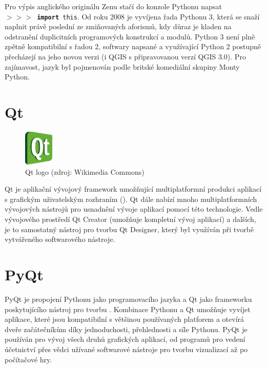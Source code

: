 Pro výpis anglického originálu Zenu stačí do konzole Pythonu napsat \\ \texttt{$>>>$~\textbf{import}~this}. Od roku 2008 je vyvíjena řada Pythonu 3, která se snaží naplnit právě poslední ze zmiňovaných aforismů, kdy důraz je kladen na odstranění duplicitních programových konstrukcí a modulů. Python 3 není plně zpětně kompatibilní s řadou 2, softwary napsané a využívající Python 2 postupně přecházejí na jeho novou verzi (i QGIS s připravovanou verzí QGIS 3.0). Pro zajímavost, jazyk byl pojmenován podle britské komediální skupiny Monty Python. \cite{pythonHistory}

\section{Qt}

\begin{figure}[H]
    \centering
      \includegraphics[width=40pt]{./pictures/qt.png}
      \caption[Qt logo]{Qt logo (zdroj: Wikimedia Commons)}
      \label{fig:python}
\end{figure}

Qt je aplikační vývojový framework umožňující multiplatformní produkci aplikací s grafickým uživatelským rozhraním (). Qt dále nabízí mnoho multiplatformních vývojových nástrojů pro usnadnění vývoje aplikací pomocí této technologie. Vedle vývojového prostředí Qt Creator (umožňuje kompletní vývoj aplikací) a dalších, je to samostatný nástroj pro tvorbu  Qt Designer, který byl využíván při tvorbě vytvářeného softwarového nástroje. \cite{qt}

\section{PyQt}
PyQt je propojení Pythonu jako programovacího jazyka a Qt jako frameworku poskytujícího nástroj pro tvorbu . Kombinace Pythonu a Qt umožňuje vyvíjet aplikace, které jsou kompatibilní s většinou používaných platforem a otevírá dveře začátečníkům díky jednoduchosti, přehlednosti a síle Pythonu. PyQt je používán pro vývoj všech druhů grafických aplikací, od programů pro vedení účetnictví přes vědci užívané softwarové nástroje pro tvorbu vizualizací až po počítačové hry. \cite{rapidPyQt}

